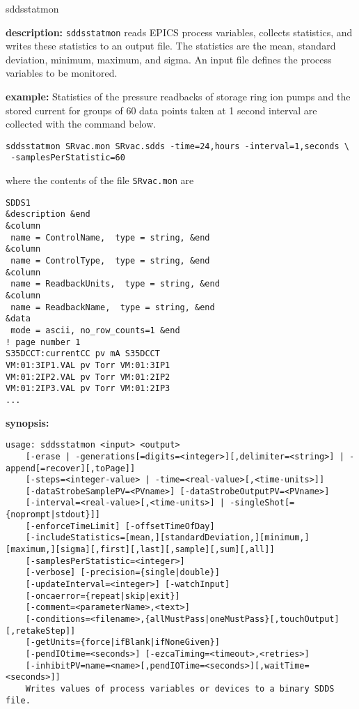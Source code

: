 \begin{sddsprog}{sddsstatmon}
\item {\bf description:}
\verb+sddsstatmon+ reads EPICS process variables, collects statistics,
and writes these statistics to an output file.
The statistics are the mean, standard deviation, minimum, maximum, and sigma.
An input file defines the process variables to be monitored.
\item {\bf example:} 
% 
Statistics of the pressure readbacks of storage ring ion pumps and the stored current 
for groups of 60 data points taken at 1 second interval are collected
with the command below.
\begin{verbatim}
sddsstatmon SRvac.mon SRvac.sdds -time=24,hours -interval=1,seconds \
 -samplesPerStatistic=60
\end{verbatim}
where the contents of the file \verb+SRvac.mon+ are
\begin{verbatim}
SDDS1
&description &end
&column
 name = ControlName,  type = string, &end
&column
 name = ControlType,  type = string, &end
&column
 name = ReadbackUnits,  type = string, &end
&column
 name = ReadbackName,  type = string, &end
&data
 mode = ascii, no_row_counts=1 &end
! page number 1
S35DCCT:currentCC pv mA S35DCCT
VM:01:3IP1.VAL pv Torr VM:01:3IP1
VM:01:2IP2.VAL pv Torr VM:01:2IP2 
VM:01:2IP3.VAL pv Torr VM:01:2IP3 
...
\end{verbatim}
\item {\bf synopsis:} 
\begin{verbatim}
usage: sddsstatmon <input> <output>
    [-erase | -generations[=digits=<integer>][,delimiter=<string>] | -append[=recover][,toPage]]
    [-steps=<integer-value> | -time=<real-value>[,<time-units>]]
    [-dataStrobeSamplePV=<PVname>] [-dataStrobeOutputPV=<PVname>]
    [-interval=<real-value>[,<time-units>] | -singleShot[={noprompt|stdout}]]
    [-enforceTimeLimit] [-offsetTimeOfDay]
    [-includeStatistics=[mean,][standardDeviation,][minimum,][maximum,][sigma][,first][,last][,sample][,sum][,all]]
    [-samplesPerStatistic=<integer>]
    [-verbose] [-precision={single|double}]
    [-updateInterval=<integer>] [-watchInput]
    [-oncaerror={repeat|skip|exit}]
    [-comment=<parameterName>,<text>]
    [-conditions=<filename>,{allMustPass|oneMustPass}[,touchOutput][,retakeStep]]
    [-getUnits={force|ifBlank|ifNoneGiven}]
    [-pendIOtime=<seconds>] [-ezcaTiming=<timeout>,<retries>]
    [-inhibitPV=name=<name>[,pendIOTime=<seconds>][,waitTime=<seconds>]]
    Writes values of process variables or devices to a binary SDDS file.

\end{verbatim}
\end{sddsprog}
